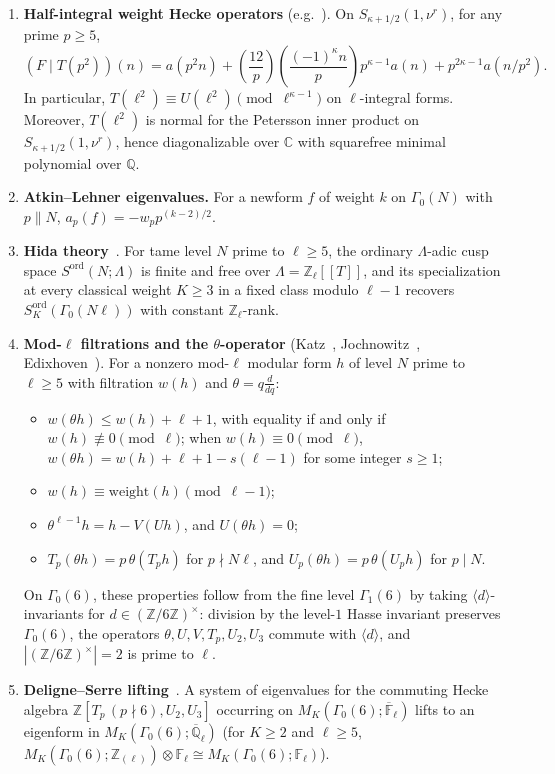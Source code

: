\documentclass[11pt,reqno]{amsart}
\theoremstyle{definition}
\theoremstyle{remark}
\newcommand{\Z}{\mathbb{Z}}
\newcommand{\Q}{\mathbb{Q}}
\newcommand{\C}{\mathbb{C}}
\newcommand{\F}{\mathbb{F}}
\newcommand{\legendre}[2]{\left(\frac{#1}{#2}\right)}
\newcommand{\ord}{\mathrm{ord}}
\begin{document}
\begin{enumerate}
  \item[\textbf{(I3)}] \textbf{Half-integral weight Hecke operators} (e.g.~\cite[\S2]{Y14}). On $S_{\kappa + 1/2}(1, \nu^r)$, for any prime $p \ge 5$,
  \[
    (F \mid T(p^2))(n) = a(p^2 n) + \legendre{12}{p}\legendre{(-1)^\kappa n}{p} p^{\kappa-1} a(n) + p^{2\kappa - 1} a(n/p^2).
  \]
  In particular, $T(\ell^2) \equiv U(\ell^2) \pmod{\ell^{\kappa-1}}$ on $\ell$-integral forms. Moreover, $T(\ell^2)$ is normal for the Petersson inner product on $S_{\kappa+1/2}(1,\nu^r)$, hence diagonalizable over $\C$ with squarefree minimal polynomial over $\Q$.

  \item[\textbf{(I4)}] \textbf{Atkin--Lehner eigenvalues.} For a newform $f$ of weight $k$ on $\Gamma_0(N)$ with $p \parallel N$, $a_p(f) = -w_p p^{(k-2)/2}$.

  \item[\textbf{(I5)}] \textbf{Hida theory}~\cite{H86a,H86b,W88}. For tame level $N$ prime to $\ell \ge 5$, the ordinary $\Lambda$-adic cusp space $S^\ord(N;\Lambda)$ is finite and free over $\Lambda = \Z_\ell[[T]]$, and its specialization at every classical weight $K \ge 3$ in a fixed class modulo $\ell - 1$ recovers $S_K^\ord(\Gamma_0(N\ell))$ with constant $\Z_\ell$-rank.

  \item[\textbf{(I6)}] \textbf{Mod-$\ell$ filtrations and the $\theta$-operator} (Katz~\cite{K77}, Jochnowitz~\cite{J82}, Edixhoven~\cite[\S3]{E92}). For a nonzero mod-$\ell$ modular form $h$ of level $N$ prime to $\ell \ge 5$ with filtration $w(h)$ and $\theta = q\frac{d}{dq}$:
  \begin{itemize}
    \item $w(\theta h) \le w(h) + \ell + 1$, with equality if and only if $w(h) \not\equiv 0 \pmod{\ell}$; when $w(h) \equiv 0 \pmod{\ell}$, $w(\theta h) = w(h) + \ell + 1 - s(\ell - 1)$ for some integer $s \ge 1$;
    \item $w(h) \equiv \text{weight}(h) \pmod{\ell - 1}$;
    \item $\theta^{\ell-1} h = h - V(Uh)$, and $U(\theta h) = 0$;
    \item $T_p(\theta h) = p\,\theta(T_p h)$ for $p \nmid N\ell$, and $U_p(\theta h) = p\,\theta(U_p h)$ for $p \mid N$.
  \end{itemize}
  On $\Gamma_0(6)$, these properties follow from the fine level $\Gamma_1(6)$ by taking $\langle d \rangle$-invariants for $d \in (\Z/6\Z)^\times$: division by the level-$1$ Hasse invariant preserves $\Gamma_0(6)$, the operators $\theta, U, V, T_p, U_2, U_3$ commute with $\langle d \rangle$, and $|(\Z/6\Z)^\times| = 2$ is prime to $\ell$.

  \item[\textbf{(I7)}] \textbf{Deligne--Serre lifting}~\cite[Lemme~6.11]{DS}. A system of eigenvalues for the commuting Hecke algebra $\Z[T_p\,(p\nmid 6), U_2, U_3]$ occurring on $M_K(\Gamma_0(6); \overline{\F}_\ell)$ lifts to an eigenform in $M_K(\Gamma_0(6); \overline{\Q}_\ell)$ (for $K \ge 2$ and $\ell \ge 5$, $M_K(\Gamma_0(6); \Z_{(\ell)}) \otimes \F_\ell \cong M_K(\Gamma_0(6); \F_\ell)$).
\end{enumerate}
\end{document}
